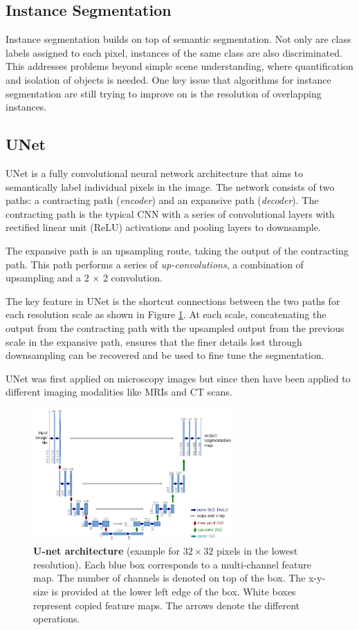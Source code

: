 \documentclass[10pt, journal, compsoc]{IEEEtran}
\begin{document}
\subsection{Instance Segmentation}
Instance segmentation builds on top of semantic segmentation. Not only are class labels assigned to each pixel, instances of the same class are also discriminated. This addresses problems beyond simple scene understanding, where quantification and isolation of objects is needed. One key issue that algorithms for instance segmentation are still trying to improve on is the resolution of overlapping instances.
\subsection{UNet}
UNet\cite{RFB15a} is a fully convolutional neural network architecture that aims to semantically label individual pixels in the image. The network consists of two paths: a contracting path (\textit{encoder}) and an expansive path (\textit{decoder}). The contracting path is the typical CNN with a series of convolutional layers with rectified linear unit (ReLU) activations and pooling layers to downsample.

The expansive path is an upsampling route, taking the output of the contracting path. This path performs a series of \textit{up-convolutions}, a combination of upsampling and a 2 $\times$ 2 convolution.

The key feature in UNet is the shortcut connections between the two paths for each resolution scale as shown in Figure \ref{fig:unet}. At each scale, concatenating the output from the contracting path with the upsampled output from the previous scale in the expansive path, ensures that the finer details lost through downsampling can be recovered and be used to fine tune the segmentation.

UNet was first applied on microscopy images\cite{RFB15a} but since then have been applied to different imaging modalities like MRIs and CT scans\cite{8681706}. 
\begin{figure}
\centering
\includegraphics[width=3in]{unet.png}
\caption{\textbf{U-net architecture}\cite{RFB15a} (example for $32\times 32$ pixels in the lowest resolution). Each blue
box corresponds to a multi-channel feature map. The number of channels is denoted
on top of the box. The x-y-size is provided at the lower left edge of the box. White
boxes represent copied feature maps. The arrows denote the different operations.}
\label{fig:unet}
\end{figure}
\end{document}

